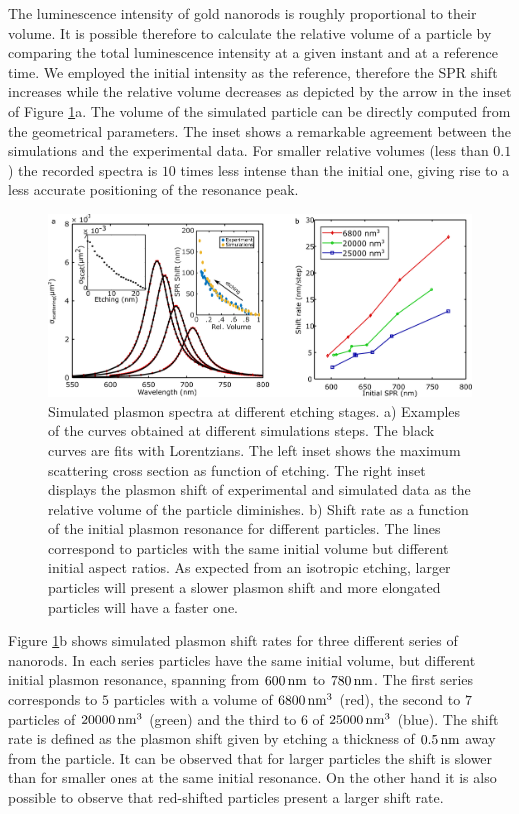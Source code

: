The luminescence intensity of gold nanorods is roughly proportional to their volume. It
is possible therefore to calculate the relative volume of a particle by
comparing the total luminescence intensity at a given instant and at a reference
time. We employed the initial intensity as the reference, therefore the
SPR shift increases while the relative volume decreases as depicted by the arrow
in the inset of Figure \ref{fig:simulations}a. The volume of the simulated
particle can be directly computed from the geometrical parameters. The inset
shows a remarkable agreement between the simulations and the experimental data.
For smaller relative volumes (less than $0.1$) the recorded spectra is $10$
times less intense than the initial one, giving rise to a less accurate
positioning of the resonance peak.

\begin{figure}[htp]
 \centering
 \includegraphics[width=\textwidth]{Chapters/02_KCN/Figures/02_Simulations/simulations.png}
 \caption{Simulated plasmon spectra at different etching stages. a) Examples of
 the curves obtained at different simulations steps. The black curves are fits
 with Lorentzians. The left inset shows the maximum scattering cross section as
 function of etching. The right inset displays the plasmon shift of
 experimental and simulated data as the relative volume of the particle
 diminishes. b) Shift rate as a function of the initial plasmon resonance for
 different particles. The lines correspond to particles with the same initial
 volume but different initial aspect ratios. As expected from an isotropic
 etching, larger particles will present a slower plasmon shift and more
 elongated particles will have a faster one.}
 \label{fig:simulations}
\end{figure}

Figure \ref{fig:simulations}b shows simulated plasmon shift rates
for three different series of nanorods. In each series particles have the same
initial volume, but different initial plasmon resonance, spanning from $600\,\textrm{nm}$
to $780\,\textrm{nm}$. The first series corresponds to $5$ particles with a volume of
$6800\,\textrm{nm}^3$ (red), the second to $7$ particles of $20000\,\textrm{nm}^3$ (green) and the
third to $6$ of $25000\,\textrm{nm}^3$ (blue). The shift rate is defined as the plasmon
shift given by etching a thickness of $0.5\,\textrm{nm}$ away from the particle. It can be
observed that for larger particles the shift is slower than for smaller ones at
the same initial resonance. On the other hand it is also possible to observe
that red-shifted particles present a larger shift rate.

